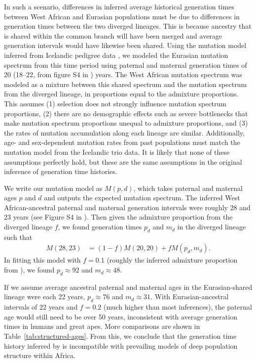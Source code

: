 \documentclass[]{article}
\begin{document}
In such a scenario, differences in inferred average historical generation times
between West African and Eurasian populations must be due to differences in
generation times between the two diverged lineages. This is because ancestry
that is shared within the common branch will have been merged and average
generation intervals would have likewise been shared.
Using the mutation model
\citet{wang2023human} inferred from Icelandic pedigree data
\citep{jonsson2017parental}, we modeled the Eurasian mutation spectrum from
this time period using paternal and maternal generation times of 20 (18--22,
from figure S4 in \citeauthor{wang2023human}) years. The West African mutation
spectrum was modeled as a mixture between this shared spectrum and the mutation
spectrum from the diverged lineage, in proportions equal to the admixture
proportions. This assumes (1) selection does not strongly influence mutation
spectrum proportions, (2) there are no demographic effects such as severe
bottlenecks that make mutation spectrum proportions unequal to admixture
proportions, and (3) the rates of mutation accumulation along each lineage are
similar. Additionally, age- and sex-dependent mutation rates from past
populations must match the mutation model from the Icelandic trio data. It is
likely that none of these assumptions perfectly hold, but these are the same
assumptions in the original inference of generation time histories.

We write our mutation model as $M(p, d)$, which takes paternal and maternal
ages $p$ and $d$ and outputs the expected mutation spectrum. The inferred West
African-ancestral paternal and maternal generation intervals were roughly 28
and 23 years (see Figure S4 in \citet{wang2023human}). Then given the
admixture proportion from the diverged lineage $f$, we found generation times
$p_d$ and $m_d$ in the diverged lineage such that
\begin{align*}
    M(28, 23) & = (1-f)M(20, 20) + fM(p_d, m_d).
\end{align*}
In fitting this model with $f=0.1$ (roughly the inferred admixture proportion
from \citet{durvasula2020recovering}), we found $p_d\approx92$ and
$m_d\approx48$.

If we assume average ancestral paternal and maternal ages in the
Eurasian-shared lineage were each 22 years, $p_d\approx76$ and $m_d\approx31$. 
With Eurasian-ancestral intervals of 22 years and $f=0.2$ (much higher than
most inferences), the paternal age would still need to be over 50 years,
inconsistent with average generation times in humans and great apes.
More comparisons are shown in Table~\ref{tab:structured-ages}.
From this, we conclude that the generation time history inferred by
\citet{wang2023human} is incompatible with prevailing models of deep population
structure within Africa.
\end{document}
